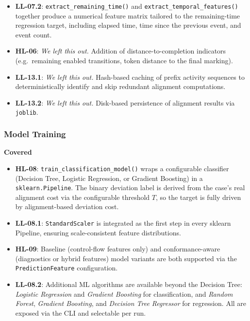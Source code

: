 \documentclass[12pt,a4paper]{article}
\begin{document}
\begin{itemize}
    \item \textbf{LL-07.2}: \texttt{extract\_remaining\_time()} and \texttt{extract\_temporal\_features()} together produce a numerical feature matrix tailored to the remaining-time regression target, including elapsed time, time since the previous event, and event count.
    \item \textbf{HL-06}:   \textit{We left this out.} Addition of distance-to-completion indicators (e.g.\ remaining enabled transitions, token distance to the final marking).
    \item \textbf{LL-13.1}: \textit{We left this out.} \noindent Hash-based caching of prefix activity sequences to deterministically identify and skip redundant alignment computations.
    \item \textbf{LL-13.2}: \textit{We left this out.} \noindent Disk-based persistence of alignment results via \texttt{joblib}.
\end{itemize}

\subsubsection{Model Training}
\textbf{Covered}
\begin{itemize}
    \item \textbf{HL-08}: \texttt{train\_classification\_model()} wraps a configurable classifier (Decision Tree, Logistic Regression, or Gradient Boosting) in a \texttt{sklearn.Pipeline}. The binary deviation label is derived from the case's real alignment cost via the configurable threshold $T$, so the target is fully driven by alignment-based deviation cost.
    \item \textbf{LL-08.1}: \texttt{StandardScaler} is integrated as the first step in every sklearn Pipeline, ensuring scale-consistent feature distributions.
    \item \textbf{HL-09}: Baseline (control-flow features only) and conformance-aware (diagnostics or hybrid features) model variants are both supported via the \texttt{PredictionFeature} configuration.
    \item \textbf{LL-08.2}: Additional ML algorithms are available beyond the Decision Tree: \textit{Logistic Regression} and \textit{Gradient Boosting} for classification, and \textit{Random Forest}, \textit{Gradient Boosting}, and \textit{Decision Tree Regressor} for regression. All are exposed via the CLI and selectable per run.
\end{itemize}
\end{document}
